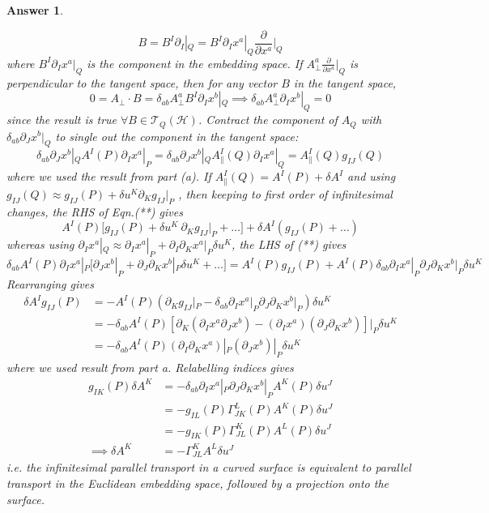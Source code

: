 \documentclass[a4paper]{article}
\theoremstyle{new2}
\newtheorem{ans}{Answer}[section]
\theoremstyle{new}
\begin{document}
\begin{ans}
\begin{enumerate}[label=(\alph*)]
$$B=B^I\partial_I|_Q=B^I\partial_Ix^a|_Q\frac{\partial}{\partial x^a}\bigg|_Q$$
where $B^I\partial_Ix^a|_Q$ is the component in the embedding space. If $A^a_\perp\frac{\partial}{\partial x^a}|_Q$ is perpendicular to the tangent space, then for any vector $B$ in the tangent space,
$$0=A_\perp\cdot B=\delta_{ab}A^a_\perp B^I\partial_Ix^b|_Q\implies \delta_{ab}A^a_\perp\partial_Ix^b|_Q=0$$
since the result is true $\forall B\in\mathcal{T}_Q(\mathcal{H})$. Contract the component of $A_Q$ with $\delta_{ab}\partial_Jx^b|_Q$ to single out the component in the tangent space:
\begin{equation}
\delta_{ab}\partial_Jx^b|_QA^I(P)\partial_Ix^a|_P=\delta_{ab}\partial_Jx^b|_QA^I_\parallel(Q)\partial_Ix^a|_Q=A_{\parallel}^I(Q)g_{IJ}(Q)\label{**}
\end{equation}
where we used the result from part (a). If $A_\parallel^I(Q)=A^I(P)+\delta A^I$ and using $g_{IJ}(Q)\approx g_{IJ}(P)+\delta u^K\partial_Kg_{IJ}|_P$ , then keeping to first order of infinitesimal changes, the RHS of Eqn.(**) gives
$$A^I(P)\bigg[g_{IJ}(P)+\delta u^K~\partial_Kg_{IJ}|_P+\dots\bigg]+\delta A^I(g_{IJ}(P)+\dots)$$
whereas using $\partial_Ix^a|_Q\approx\partial_Ix^a|_P+\partial_I\partial_Kx^a|_P\delta u^K$, the LHS of (**) gives
$$\delta_{ab}A^I(P)\partial_Ix^a|_P\bigg[\partial_Jx^b|_P+\partial_J\partial_Kx^b|_P\delta u^K+\dots\bigg]=A^I(P)g_{IJ}(P)+A^I(P)\delta_{ab}\partial_Ix^a|_P\partial_J\partial_Kx^b|_P\delta u^K$$
Rearranging gives
\begin{align}
    \delta A^Ig_{IJ}(P)&=-A^I(P)(\partial_Kg_{IJ}|_P-\delta_{ab}\partial_Ix^a|_P\partial_J\partial_Kx^b|_P)\delta u^K\nonumber\\&=-\delta_{ab}A^I(P)[\partial_K(\partial_Ix^a\partial_Jx^b)-(\partial_Ix^a)(\partial_J\partial_Kx^b)]|_P\delta u^K\nonumber\\&=-\delta_{ab}A^I(P)(\partial_I\partial_Kx^a)|_P(\partial_Jx^b)|_P\delta u^K\nonumber
\end{align}
where we used result from part a. Relabelling indices gives
\begin{align}
g_{IK}(P)\delta A^K&=-\delta_{ab}\partial_Ix^a|_P\partial_J\partial_Kx^b|_PA^K(P)\delta u^J\nonumber\\&=-g_{IL}(P)\Gamma^L_{JK}(P)A^K(P)\delta u^J\nonumber\\&=-g_{IK}(P)\Gamma^K_{JL}(P)A^L(P)\delta u^J\nonumber\\\implies \delta A^K&=-\Gamma^K_{JL}A^L\delta u^J\nonumber
\end{align}
i.e. the infinitesimal parallel transport in a curved surface is equivalent to parallel transport in the Euclidean embedding space, followed by a projection onto the surface.
\end{enumerate}
\end{ans}
\end{document}

